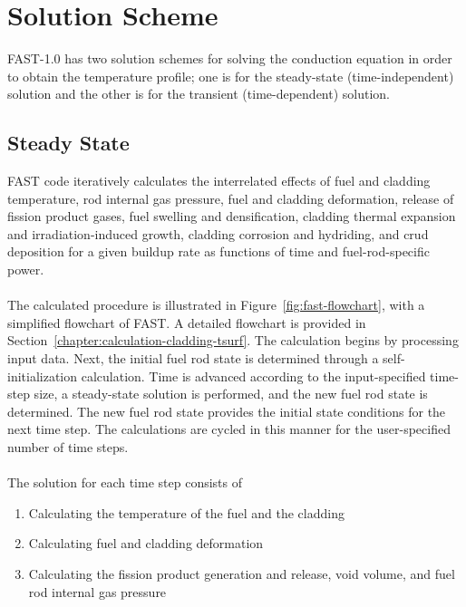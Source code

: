 \section{Solution Scheme}

FAST-1.0 has two solution schemes for solving the conduction equation in order to obtain the
temperature profile; one is for the steady-state (time-independent) solution and the other is for
the transient (time-dependent) solution.
\subsection{Steady State} \label{section:steady-state}

FAST code iteratively calculates the interrelated effects of fuel and cladding temperature, rod
internal gas pressure, fuel and cladding deformation, release of fission product gases, fuel
swelling and densification, cladding thermal expansion and irradiation-induced growth, cladding
corrosion and hydriding, and crud deposition for a given buildup rate as functions of time and
fuel-rod-specific power.
\\
\\
\noindent
The calculated procedure is illustrated in Figure~\ref{fig:fast-flowchart}, with a simplified
flowchart of FAST. A detailed flowchart is provided in
Section~\ref{chapter:calculation-cladding-tsurf}. The calculation begins by processing input data.
Next, the initial fuel rod state is determined through a self-initialization calculation. Time is
advanced according to the input-specified time-step size, a steady-state solution is performed, and
the new fuel rod state is determined. The new fuel rod state provides the initial state conditions
for the next time step. The calculations are cycled in this manner for the user-specified number of
time steps.
\\
\\
The solution for each time step consists of 

\begin{enumerate}

    \item Calculating the temperature of the fuel and the cladding 

    \item Calculating fuel and cladding deformation 
        
    \item Calculating the fission product generation and release, void volume, and fuel rod internal
        gas pressure 
        
\end{enumerate}

